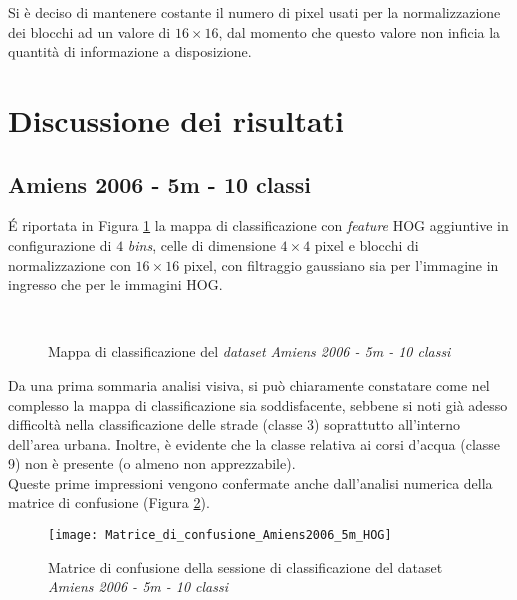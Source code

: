 Si è deciso di mantenere costante il numero di pixel usati per la normalizzazione dei blocchi ad un valore di $16\times16$, dal momento che questo valore non inficia la quantità di informazione a disposizione.

\clearpage
\section{Discussione dei risultati}
\subsection{Amiens 2006 - 5m - 10 classi}
\'E riportata in Figura \ref{fig:ClassMap_Amiens2006_5m} la mappa di classificazione con \emph{feature} HOG aggiuntive in configurazione di $4$ \emph{bins}, celle di dimensione $4\times4$ pixel e blocchi di normalizzazione con $16\times16$ pixel, con filtraggio gaussiano sia per l'immagine in ingresso che per le immagini HOG.
\begin{figure}[!ht]
 \center
      \\
     
    \caption{Mappa di classificazione del \emph{dataset} \emph{Amiens 2006 - 5m - 10 classi}}
    \label{fig:ClassMap_Amiens2006_5m}
  \end{figure} 
 
Da una prima sommaria analisi visiva, si può chiaramente constatare come nel complesso la mappa di classificazione sia soddisfacente, sebbene si noti già adesso difficoltà nella classificazione delle strade (classe 3) soprattutto all'interno dell'area urbana. Inoltre, è evidente che la classe relativa ai corsi d'acqua (classe 9) non è presente (o almeno non apprezzabile).\\

Queste prime impressioni vengono confermate anche dall'analisi numerica della matrice di confusione (Figura \ref{fig:Matrice_di_confusione_Amiens2006_5m_HOG}). 
\begin{figure}[!ht]
    \texttt{[image: Matrice\_di\_confusione\_Amiens2006\_5m\_HOG]}
    \caption{Matrice di confusione della sessione di classificazione del dataset \emph{Amiens 2006 - 5m - 10 classi}}
    \label{fig:Matrice_di_confusione_Amiens2006_5m_HOG}
\end{figure}

